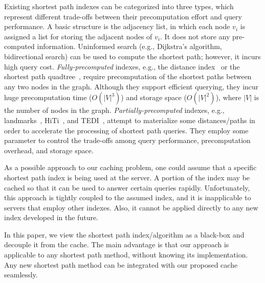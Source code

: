 \documentclass{sig-alternate}
\newcommand{\stitle}[1]{\vspace*{0.4em}\noindent{\bf #1:\/}}
\begin{document}
\stitle{Shortest Path Computation}
%
Existing shortest path indexes can be categorized into three types,
which represent different trade-offs between their precomputation effort and query performance.
%
A basic structure is the adjacency list, in which each node $v_i$ is assigned a
list for storing the adjacent nodes of $v_i$. It does not store any pre-computed information.
Uninformed search (e.g., Dijkstra's algorithm, bidirectional search) can be used to
compute the shortest path; however, it incurs high query cost.
%
{\em Fully-precomputed} indexes, e.g., the distance index~\cite{HuLL06} or
the shortest path quadtree~\cite{SametSA08}, require precomputation of the shortest paths between any two nodes in the graph.
Although they support efficient querying, they incur huge precomputation time ($O(|V|^3)$)
and storage space ($O(|V|^2)$), where $|V|$ is the number of nodes in the graph.
%
{\em Partially-precomputed} indexes, e.g., landmarks~\cite{Kriegel08}, HiTi~\cite{jung02}, and TEDI~\cite{Wei10},
attempt to materialize some distances/paths in order to accelerate the processing of shortest path queries.
They employ some parameter to control the trade-offs among query performance, precomputation overhead, and storage space.






As a possible approach to our caching problem,
one could assume that a specific shortest path index is being used at the server.
A portion of the index may be cached so that it can be used to answer certain queries rapidly.
Unfortunately, this approach is tightly coupled to the assumed index, and
it is inapplicable to servers that employ other indexes.
Also, it cannot be applied directly to any new index developed in the future.


In this paper, we view the shortest path index/algorithm as a black-box
and decouple it from the cache.
The main advantage is that our approach is applicable to any shortest path method,
without knowing its implementation. Any new shortest path method can be
integrated with our proposed cache seamlessly.
\end{document}
